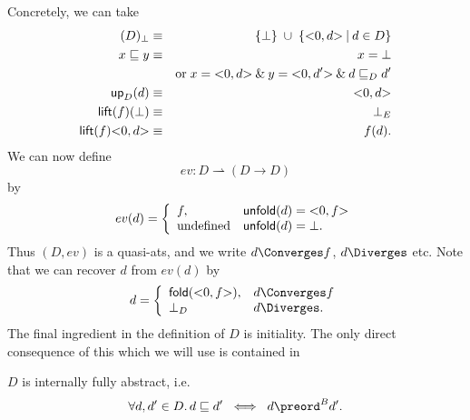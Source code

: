 Concretely, we can take
\begin{eqnarray*}
(D)_{\bot} & \equiv & \{ \bot \} \; \cup \; \{ {<}0, d{>} \: | \: d \in D \} \\
x \sqsubseteq y & \equiv & x = {\bot} \\
& & \mbox{or} \; x = {<}0, d{>} \: \& \: y = {<}0, d'{>} \: \& \: d \sqsubseteq_{D} d' \\
{\sf up}_{D}(d) & \equiv & {<}0, d{>} \\
{\sf lift}(f)(\bot ) & \equiv & \bot_{E} \\
{\sf lift}(f) {<}0, d{>} & \equiv & f(d) .
\end{eqnarray*}
We can now define
\[ ev : D \rightharpoonup (D \rightarrow D) \]
by
\[ ev(d) = \left\{ \begin{array}{ll}
f, & {\sf unfold}(d) = {<}0, f{>} \\
{\rm undefined} & {\sf unfold}(d) = \bot .
\end{array} \right. \]
Thus $(D, ev)$ is a quasi-ats, and we write $d \Converges f$, $d \Diverges$ etc. Note that we can recover $d$ from $ev(d)$ by
\[ d = \left\{ \begin{array}{ll}
{\sf fold}({<}0, f{>}),  & d \Converges f \\
\bot_{D} & d \Diverges .
\end{array} \right. \]
The final ingredient in the definition of $D$ is initiality. 
The only direct consequence of this which we will use is contained in
\begin{theorem}
$D$ is internally fully abstract, i.e.
\[ \forall d, d' \in D . \, d \sqsubseteq d' \;\; \Longleftrightarrow \;\; d \preord^{B} d' . \]
\end{theorem}

